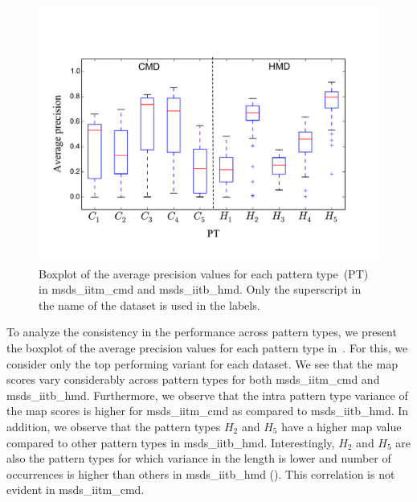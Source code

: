 \begin{figure}
	\begin{center}
		\includegraphics[width=\figSizeEightyFive]{ch06_patterns/figures/SimilarityEvaluation/CMD_HMD_CW_MAP.pdf}
	\end{center}
	\caption[Boxplot of average precision values for different types of melodic patterns]{Boxplot of the average precision values for each pattern type~(PT) in \acrshort{msds_iitm_cmd} and \acrshort{msds_iitb_hmd}. Only the superscript in the name of the dataset is used in the labels.}
	\label{fig:patterns_similarity_evaluation_results_boxplot}
\end{figure}


To analyze the consistency in the performance across pattern types, we present the boxplot of the average precision values for each pattern type in~. For this, we consider only the top performing variant for each dataset. We see that the \gls{map} scores vary considerably across pattern types for both \acrshort{msds_iitm_cmd} and \acrshort{msds_iitb_hmd}. Furthermore, we observe that the intra pattern type variance of the \gls{map} scores is higher for \acrshort{msds_iitm_cmd} as compared to \acrshort{msds_iitb_hmd}. In addition, we observe that the pattern types $H_2$ and $H_5$ have a higher \gls{map} value compared to other pattern types in \acrshort{msds_iitb_hmd}. Interestingly, $H_2$ and $H_5$ are also the pattern types for which variance in the length is lower and number of occurrences is higher than others in \acrshort{msds_iitb_hmd} (). This correlation is not evident in \acrshort{msds_iitm_cmd}. 


